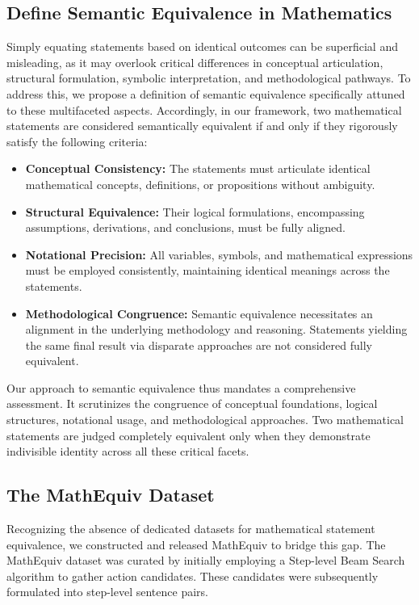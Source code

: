 \documentclass[11pt]{article}
\begin{document}
\subsection{Define Semantic Equivalence in Mathematics}
Simply equating statements based on identical outcomes can be superficial and misleading, as it may overlook critical differences in conceptual articulation, structural formulation, symbolic interpretation, and methodological pathways. To address this, we propose a definition of semantic equivalence specifically attuned to these multifaceted aspects. Accordingly, in our framework, two mathematical statements are considered semantically equivalent if and only if they rigorously satisfy the following criteria:
\begin{itemize}
\item \textbf{Conceptual Consistency:} The statements must articulate identical mathematical concepts, definitions, or propositions without ambiguity.
\item \textbf{Structural Equivalence:} Their logical formulations, encompassing assumptions, derivations, and conclusions, must be fully aligned.
\item \textbf{Notational Precision:} All variables, symbols, and mathematical expressions must be employed consistently, maintaining identical meanings across the statements.
\item \textbf{Methodological Congruence:} Semantic equivalence necessitates an alignment in the underlying methodology and reasoning. Statements yielding the same final result via disparate approaches are not considered fully equivalent.
\end{itemize}

Our approach to semantic equivalence thus mandates a comprehensive assessment. It scrutinizes the congruence of conceptual foundations, logical structures, notational usage, and methodological approaches. Two mathematical statements are judged completely equivalent only when they demonstrate indivisible identity across all these critical facets.

\subsection{The MathEquiv Dataset}
Recognizing the absence of dedicated datasets for mathematical statement equivalence, we constructed and released MathEquiv to bridge this gap.
The MathEquiv dataset was curated by initially employing a Step-level Beam Search algorithm \citep{chenalphamath} to gather action candidates. These candidates were subsequently formulated into step-level sentence pairs.
\end{document}
